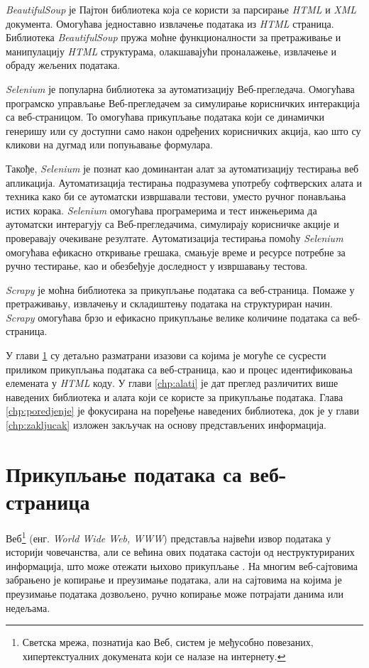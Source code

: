 \documentclass[12pt,oneside]{memoir}
\begin{document}
\textit{BeautifulSoup} је Пајтон библиотека која се користи за парсирање \textit{HTML} и \textit{XML} документа. Омогућава једноставно извлачење података из \textit{HTML} страница. Библиотека \textit{BeautifulSoup} пружа моћне функционалности за претраживање и манипулацију \textit{HTML} структурама, олакшавајући проналажење, извлачење и обраду жељених података.

\textit{Selenium} је популарна библиотека за аутоматизацију Веб-прегледача. Омогућава програмско управљање Веб-прегледачем за симулирање корисничких интеракција са веб-страницом. То омогућава прикупљање података који се динамички генеришу или су доступни само након одређених корисничких акција, као што су кликови на дугмад или попуњавање формулара.

Такође, \textit{Selenium} је познат као доминантан алат за аутоматизацију тестирања веб апликација. Аутоматизација тестирања подразумева употребу софтверских алата и техника како би се аутоматски извршавали тестови, уместо ручног понављања истих корака. \textit{Selenium} омогућава програмерима и тест инжењерима да аутоматски интерагују са Веб-прегледачима, симулирају корисничке акције и проверавају очекиване резултате. Аутоматизација тестирања помоћу \textit{Selenium} омогућава ефикасно откривање грешака, смањује време и ресурсе потребне за ручно тестирање, као и обезбеђује доследност у извршавању тестова.

\textit{Scrapy} је моћна библиотека за прикупљање података са веб-страница. Помаже у претраживању, извлачењу и складиштењу података на структуриран начин. \textit{Scrapy} омогућава брзо и ефикасно прикупљање велике количине података са веб-страница. 

У глави \ref{chp:prikupljanje} су детаљно разматрани изазови са којима је могуће се сусрести приликом прикупљања података са веб-страница, као и процес идентификовања елемената у \textit{HTML} коду. У глави \ref{chp:alati} је дат преглед различитих више наведених библиотека и алата који се користе за прикупљање података. Глава \ref{chp:poredjenje} је фокусирана на поређење наведених библиотека, док је у глави \ref{chp:zakljucak} изложен закључак на основу представљених информација.

\chapter{Прикупљање података са веб-страница}
\label{chp:prikupljanje}
Веб\footnote{Светска мрежа, познатија као Веб, систем је међусобно повезаних, хипертекстуалних докумената који се налазе на интернету.} (енг. \textit{World Wide Web, WWW}) представља највећи извор података у историји човечанства, али се већина ових података састоји од неструктурираних информација, што може отежати њихово прикупљање \cite{osmarPaper}. 
На многим веб-сајтовима забрањено је копирање и преузимање података, али на сајтовима на којима је преузимање података дозвољено, ручно копирање може потрајати данима или недељама.
\end{document}
